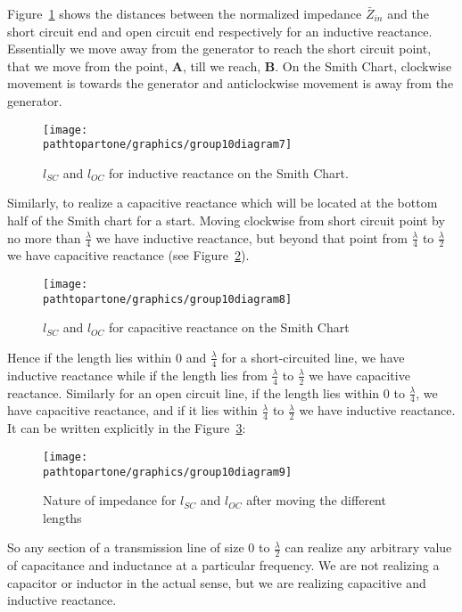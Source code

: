 Figure~\ref{fig:group10diagram7} shows the distances between the normalized impedance $\bar{Z}_{in}$ and the short circuit end and open circuit end respectively for an inductive reactance. Essentially we move away from the generator to reach the short circuit point, that we move from the point, \textbf{A}, till we reach, \textbf{B}. On the Smith Chart, clockwise movement is towards the generator and anticlockwise movement is away from the generator.
\begin{figure}[h]
\centering
\texttt{[image: \\pathtopartone/graphics/group10diagram7]}
\caption{$ l_{SC} $ and $ l_{OC} $ for inductive reactance on the Smith Chart.}
\label{fig:group10diagram7}
\end{figure}

Similarly, to realize a capacitive reactance which will be located at the bottom half of the Smith chart for a start. Moving clockwise from short circuit point by no more than $\frac{\lambda}{4}$ we have inductive reactance, but beyond that point from $\frac{\lambda}{4}$ to $\frac{\lambda}{2}$ we have capacitive reactance (see Figure~\ref{fig:group10diagram9}).
\begin{figure}[h]
\centering
\texttt{[image: \\pathtopartone/graphics/group10diagram8]}
\caption{$ l_{SC} $ and $ l_{OC} $ for capacitive reactance on the Smith Chart}
\label{fig:group10diagram9}
\end{figure}

Hence if the length lies within 0 and $ \frac{\lambda}{4} $ for a short-circuited line, we have inductive reactance while if the length lies from $ \frac{\lambda}{4} $ to $ \frac{\lambda}{2} $ we have capacitive reactance. Similarly for an open circuit line, if the length lies within 0 to $ \frac{\lambda}{4} $, we have capacitive reactance, and if it lies within $ \frac{\lambda}{4} $ to $ \frac{\lambda}{2} $ we have inductive reactance. It can be written explicitly in the Figure~\ref{fig:group10diagram10}:
\begin{figure}[h]
\centering
\texttt{[image: \\pathtopartone/graphics/group10diagram9]}
\caption{Nature of impedance for $ l_{SC} $ and $ l_{OC} $ after moving the different lengths}
\label{fig:group10diagram10}
\end{figure}

So any section of a transmission line of size 0 to $\frac{\lambda}{2} $ can realize any arbitrary value of capacitance and inductance at a particular frequency. We are not realizing a capacitor or inductor in the actual sense, but we are realizing capacitive and inductive reactance.

